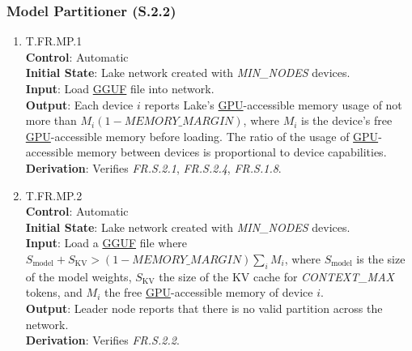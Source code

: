 \documentclass[12pt, titlepage]{article}
\providecommand{\glink}[2]{\hyperlink{gls:#1}{#2}}
\begin{document}
\subsubsection{Model Partitioner (S.2.2)}
\begin{enumerate}
	\item{T.FR.MP.1}\label{T.FR.MP.1} \\
		\textbf{Control}: Automatic \\
		\textbf{Initial State}: Lake network created with \textit{MIN\_NODES} devices. \\
		\textbf{Input}: Load \glink{gguf}{GGUF} file into network. \\
		\textbf{Output}: Each device $i$ reports Lake's \glink{gpu}{GPU}-accessible memory usage of not more
		than $M_i(1 - \textit{MEMORY\_MARGIN})$, where $M_i$ is the device's free
		\glink{gpu}{GPU}-accessible memory before loading. The ratio of the usage of
		\glink{gpu}{GPU}-accessible memory between devices is proportional to device capabilities. \\
		\textbf{Derivation}: Verifies \textit{FR.S.2.1}, \textit{FR.S.2.4}, \textit{FR.S.1.8}.
	\item{T.FR.MP.2}\label{T.FR.MP.2} \\
		\textbf{Control}: Automatic \\
		\textbf{Initial State}: Lake network created with \textit{MIN\_NODES} devices. \\
		\textbf{Input}: Load a \glink{gguf}{GGUF} file where $S_{\mathrm{model}} + S_{\mathrm{KV}} >
		(1 - \textit{MEMORY\_MARGIN})\sum_i M_i$, where $S_{\mathrm{model}}$ is the size of the
		model weights, $S_{\mathrm{KV}}$ the size of the KV cache for \textit{CONTEXT\_MAX} tokens, and
		$M_i$ the free \glink{gpu}{GPU}-accessible memory of device $i$. \\
		\textbf{Output}: Leader node reports that there is no valid partition across the network. \\
		\textbf{Derivation}: Verifies \textit{FR.S.2.2}.
\end{enumerate}
\end{document}
